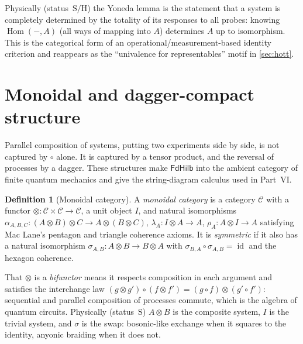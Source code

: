 \documentclass[12pt]{article}
\theoremstyle{definition}
\newtheorem{definition}[theorem]{Definition}
\theoremstyle{remark}
\newcommand{\FdHilb}{\mathsf{FdHilb}}
\newcommand{\Hom}{\operatorname{Hom}}
\newcommand{\id}{\operatorname{id}}
\begin{document}
Physically (status~$\mathrm{S/H}$) the Yoneda lemma is the statement that a
system is completely determined by the totality of its responses to all probes:
knowing $\Hom(-,A)$ (all ways of mapping into $A$) determines $A$ up to
isomorphism. This is the categorical form of an operational/measurement-based
identity criterion and reappears as the ``univalence for representables'' motif
in \cref{sec:hott}.

\section{Monoidal and dagger-compact structure}
\label{sec:monoidal}

Parallel composition of systems, putting two experiments side by side, is not
captured by $\circ$ alone. It is captured by a tensor product, and the reversal
of processes by a dagger. These structures make $\FdHilb$ into the ambient
category of finite quantum mechanics and give the string-diagram calculus used
in Part~VI.

\begin{definition}[Monoidal category]
\label{def:monoidal}
A \emph{monoidal category} is a category $\mathcal{C}$ with a functor
$\otimes:\mathcal{C}\times\mathcal{C}\to\mathcal{C}$, a unit object $I$, and
natural isomorphisms $\alpha_{A,B,C}:(A\otimes B)\otimes C\to A\otimes(B\otimes
C)$, $\lambda_A:I\otimes A\to A$, $\rho_A:A\otimes I\to A$ satisfying Mac Lane's
pentagon and triangle coherence axioms. It is \emph{symmetric} if it also has a
natural isomorphism $\sigma_{A,B}:A\otimes B\to B\otimes A$ with
$\sigma_{B,A}\circ\sigma_{A,B}=\id$ and the hexagon coherence.
\end{definition}

That $\otimes$ is a \emph{bifunctor} means it respects composition in each
argument and satisfies the interchange law $(g\otimes g')\circ(f\otimes
f')=(g\circ f)\otimes(g'\circ f')$: sequential and parallel composition of
processes commute, which is the algebra of quantum circuits. Physically
(status~$\mathrm{S}$) $A\otimes B$ is the composite system, $I$ is the trivial
system, and $\sigma$ is the swap: bosonic-like exchange when it squares to the
identity, anyonic braiding when it does not.
\end{document}
